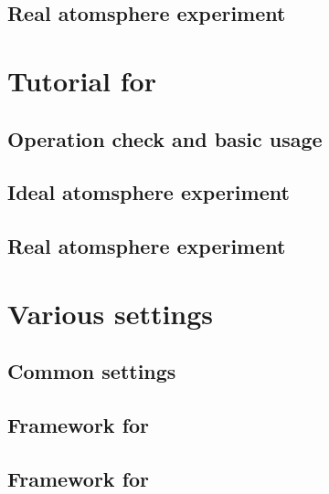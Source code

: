 \documentclass[a4paper]{report}
\begin{document}
 \chapter{Real atomsphere experiment} \label{chap:tutorial_real}
 
 
 
 
 
 
 


\part{Tutorial for \scalegm}
 \chapter{Operation check and basic usage}
 
 \chapter{Ideal atomsphere experiment}
 
 \chapter{Real atomsphere experiment}


\part{Various settings} \label{part:basic_usel}
 \chapter{Common settings}
 
 
 

 \chapter{Framework for \scalerm}
 
 
 
 
 
 \clearpage
 
 
 
 
 
 
 
 

 \chapter{Framework for \scalegm}
 
\end{document}
